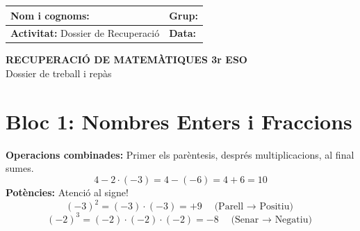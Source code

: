 \documentclass[12pt,a4paper]{article}
\begin{document}
\begingroup
\renewcommand{\arraystretch}{2}
\begin{tabularx}{\textwidth}{|X|p{4cm}|}
    \hline
    \textbf{Nom i cognoms:} & \textbf{Grup:} \\ \hline
    \textbf{Activitat:} Dossier de Recuperació & \textbf{Data:} \\ \hline
\end{tabularx}
\endgroup

\vspace{0.5cm}
\begin{center}
    {\LARGE \textbf{RECUPERACIÓ DE MATEMÀTIQUES 3r ESO}} \\
    \vspace{0.2cm}
    {\large Dossier de treball i repàs}
\end{center}
\vspace{0.5cm}

\section*{Bloc 1: Nombres Enters i Fraccions}

\begin{exemple}
\textbf{Operacions combinades:} Primer els parèntesis, després multiplicacions, al final sumes.
$$ 4 - 2 \cdot (-3) = 4 - (-6) = 4 + 6 = 10 $$
\textbf{Potències:} Atenció al signe!
$$ (-3)^2 = (-3)\cdot(-3) = +9 \quad \text{(Parell $\to$ Positiu)} $$
$$ (-2)^3 = (-2)\cdot(-2)\cdot(-2) = -8 \quad \text{(Senar $\to$ Negatiu)} $$
\end{exemple}
\end{document}
